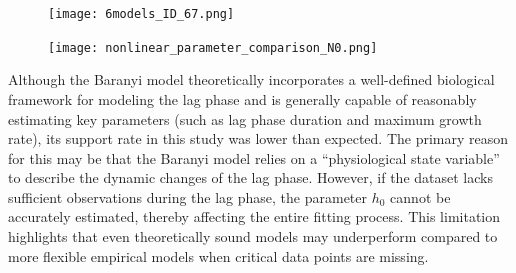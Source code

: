 \documentclass[12pt]{article}
\begin{document}
\begin{figure}[htbp]
  \centering
  \begin{minipage}[t]{0.45\textwidth}
    \centering
    \texttt{[image: 6models\_ID\_67.png]}
    \label{fig:ID67}
  \end{minipage}
  \hfill
  \begin{minipage}[t]{0.45\textwidth}
    \centering
    \texttt{[image: nonlinear\_parameter\_comparison\_N0.png]}
    \label{fig:paramN0}
  \end{minipage}

\end{figure}
Although the Baranyi model theoretically incorporates a well-defined biological framework for modeling the lag phase and is generally capable of reasonably estimating key parameters (such as lag phase duration and maximum growth rate), its support rate in this study was lower than expected. The primary reason for this may be that the Baranyi model relies on a ``physiological state variable'' to describe the dynamic changes of the lag phase. However, if the dataset lacks sufficient observations during the lag phase, the parameter $h_0$ cannot be accurately estimated, thereby affecting the entire fitting process. This limitation highlights that even theoretically sound models may underperform compared to more flexible empirical models when critical data points are missing.
\end{document}

